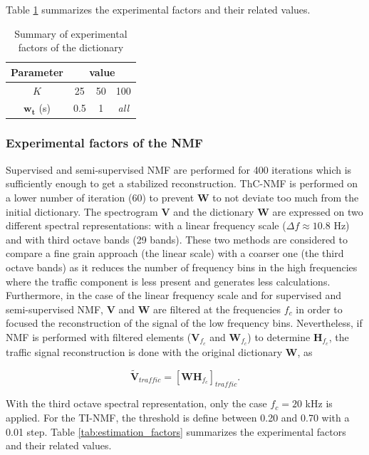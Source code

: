 \documentclass[twocolumn,a4paper,10pt]{article}
\begin{document}
Table \ref{tab:dictionary_factors} summarizes the experimental factors and their related values.

\begin{table}[h]
\centering
\begin{tabular}{cccc}
Parameter &  \multicolumn{3}{c}{value}\\ \hline
$K$ & 25  & 50 & 100 \\ \hline
$\mathbf{w_t}$ (s)& 0.5 & 1  & \textit{all}
\end{tabular}
\caption{Summary of experimental factors of the dictionary}
\label{tab:dictionary_factors}
\end{table}

\subsubsection{Experimental factors of the NMF}

Supervised and semi-supervised NMF are performed for 400 iterations which is sufficiently enough to get a stabilized reconstruction. ThC-NMF is performed on a lower number of iteration (60) to prevent $\mathbf{W}$ to not deviate too much from the initial dictionary. The spectrogram $\mathbf{V}$ and the dictionary $\mathbf{W}$ are expressed on two different spectral representations: with a linear frequency scale ($\Delta f \approx 10.8$ Hz) and with third octave bands (29 bands). These two methods are considered to compare a fine grain approach (the linear scale) with a coarser one (the third octave bands) as it reduces the number of frequency bins in the high frequencies where the traffic component is less present and generates less calculations. Furthermore, in the case of the linear frequency scale and for supervised and semi-supervised NMF, $\mathbf{V}$ and $\mathbf{W}$ are filtered at the frequencies $f_c$ in order to focused the reconstruction of the signal of the low frequency bins. Nevertheless, if NMF is performed with filtered elements ($\mathbf{V}_{f_c}$ and $\mathbf{W}_{f_c}$) to determine $\mathbf{H}_{f_c}$, the traffic signal reconstruction is done with the original dictionary $\mathbf{W}$, as

\begin{equation}
\mathbf{\tilde{V}}_{traffic} = \left[\mathbf{WH}_{f_c}\right]_{traffic}.
\end{equation}

With the third octave spectral representation, only the case $f_c = 20$ kHz is applied. For the TI-NMF, the threshold is define between 0.20 and 0.70 with a 0.01 step. Table \ref{tab:estimation_factors} summarizes the experimental factors and their related values.
\end{document}
